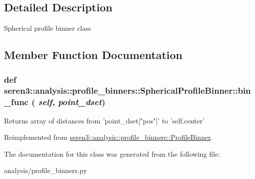 \subsection{Detailed Description}
\begin{DoxyVerb}
Spherical profile binner class
\end{DoxyVerb}
 

\subsection{Member Function Documentation}
\hypertarget{classseren3_1_1analysis_1_1profile__binners_1_1SphericalProfileBinner_a3aee2654d4212ebb91eaef43be33792b}{
\subsubsection[{bin\_\-func}]{\setlength{\rightskip}{0pt plus 5cm}def seren3::analysis::profile\_\-binners::SphericalProfileBinner::bin\_\-func ( {\em self}, \/   {\em point\_\-dset})}}
\label{classseren3_1_1analysis_1_1profile__binners_1_1SphericalProfileBinner_a3aee2654d4212ebb91eaef43be33792b}
\begin{DoxyVerb}
Returns array of distances from 'point_dset["pos"]' to 'self.center'
\end{DoxyVerb}
 

Reimplemented from \hyperlink{classseren3_1_1analysis_1_1profile__binners_1_1ProfileBinner}{seren3::analysis::profile\_\-binners::ProfileBinner}.

The documentation for this class was generated from the following file:\begin{DoxyCompactItemize}
\item 
analysis/profile\_\-binners.py\end{DoxyCompactItemize}
